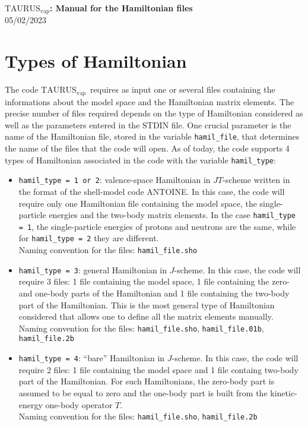 \documentclass[a4paper,11pt]{article}
\newcommand{\TAURUSvap}{$\text{TAURUS}_{\text{vap}}$}
\newcommand{\TAURUSvapt}{$\text{TAURUS}_{\text{vap}}$~}
\renewcommand{\tt}[1]{\texttt{#1}}
\begin{document}
%
% 
\begin{center}
 {\LARGE \textbf{\TAURUSvap: Manual for the Hamiltonian files}} \\[0.20cm]
 {\large 05/02/2023}
\end{center}

%
% 
\section{Types of Hamiltonian}

The code \TAURUSvapt requires as input one or several files containing the informations about the model space and the Hamiltonian matrix elements.
The precise number of files required depends on the type of Hamiltonian considered as well as the parameters entered in the STDIN file.
One crucial parameter is the name of the Hamiltonian file, stored in the variable \tt{hamil\_file}, that determines the name of the files that the code will open.
As of today, the code supports 4 types of Hamiltonian associated in the code with the variable \tt{hamil\_type}:

\begin{itemize}
  \item \tt{hamil\_type = 1 or 2}: valence-space Hamiltonian in $JT$-scheme written in the format of the shell-model code ANTOINE.
  In this case, the code will require only one Hamiltonian file containing the model space, the single-particle energies and the 
  two-body matrix elements. 
  In the case \tt{hamil\_type = 1}, the single-particle energies of protons and neutrons are the same, while for 
  \tt{hamil\_type = 2} they are different. \\
  Naming convention for the files: \tt{hamil\_file.sho}
  
  \item \tt{hamil\_type = 3}: general Hamiltonian in $J$-scheme. In this case, the code will require
  3 files: 1 file containing the model space, 1 file containing the zero- and one-body parts of the Hamiltonian and 1 file containing the
  two-body part of the Hamiltonian. This is the most general type of Hamiltonian considered that allows one to define all the matrix elements
  manually. \\
  Naming convention for the files: \tt{hamil\_file.sho}, \tt{hamil\_file.01b}, \tt{hamil\_file.2b} 

  \item \tt{hamil\_type = 4}: ``bare'' Hamiltonian in $J$-scheme. In this case, the code will require
  2 files: 1 file containing the model space and 1 file containg two-body part of the Hamiltonian. For such Hamiltonians, the zero-body part
  is assumed to be equal to zero and the one-body part is built from the kinetic-energy one-body operator $T$. \\
  Naming convention for the files: \tt{hamil\_file.sho}, \tt{hamil\_file.2b} 
  
\end{itemize}
\end{document}
